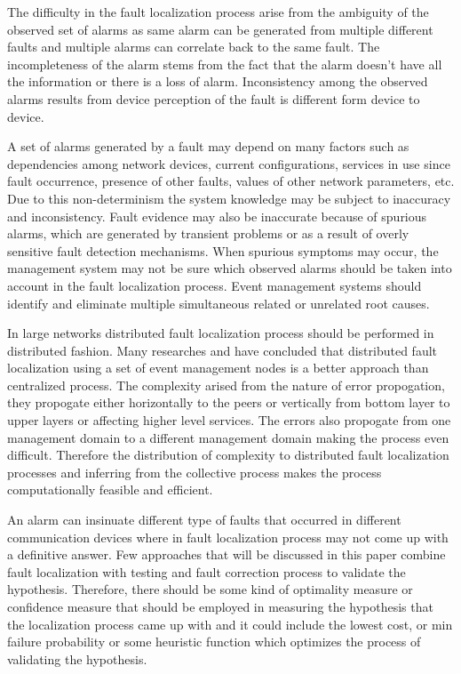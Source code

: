 \documentclass[10pt]{sigplan-proc-varsize}
\begin{document}
The difficulty in the fault localization process arise from the ambiguity of the observed set of alarms as same alarm can be generated from multiple different faults 
and multiple alarms can correlate back to the same fault. The incompleteness of the alarm stems from the fact that the alarm doesn't have all the information or 
there is a loss of alarm. Inconsistency among the observed alarms results from device perception of the fault is different form device to device.  

A set of alarms generated by a fault may depend on many factors such as dependencies among network devices, current configurations, services in use since 
fault occurrence, presence of other faults, values of other network parameters, etc. Due to this non-determinism the system knowledge may be subject to inaccuracy 
and inconsistency. Fault evidence may also be inaccurate because of spurious alarms, which are generated by transient problems or as a result of overly sensitive 
fault detection mechanisms. When spurious symptoms may occur, the management system may not be sure which observed alarms should be taken into account in the fault 
localization process. Event management systems should identify and eliminate multiple simultaneous related or unrelated root causes. 

In large networks distributed fault localization process should be performed in distributed fashion. Many researches \cite{Katzela:1995} and \cite{Yemini:1996} have 
concluded that distributed fault localization using a set of event management nodes is a better approach than centralized process. The complexity arised from the nature 
of error propogation, they propogate either horizontally to the peers or vertically from bottom layer to upper layers or affecting higher level services. The errors also
propogate from one management domain to a different management domain making the process even difficult. Therefore the distribution of complexity to distributed fault 
localization processes and inferring from the collective process makes the process computationally feasible and efficient. 

An alarm can insinuate different type of faults that occurred in different communication devices where in fault localization process may not come up with a 
definitive answer. Few approaches that will be discussed in this paper combine fault localization with testing and fault correction process to validate the hypothesis. 
Therefore, there should be some kind of optimality measure or confidence measure that should be employed in measuring the hypothesis that the localization process 
came up with and it could include the lowest cost, or min failure probability or some heuristic function which optimizes the process of validating the hypothesis.
\end{document}
